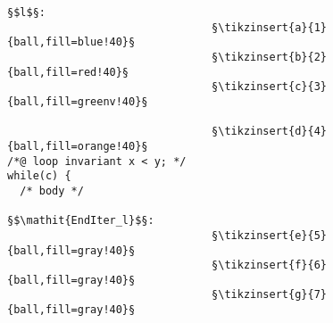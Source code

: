 \begin{figure}[bt]
  \begin{minipage}{0.65\textwidth}
  \end{minipage}\hfill
  \begin{minipage}{0.49\textwidth}
    \begin{lstlisting}[escapechar=§]
§$l$§:
                                §\tikzinsert{a}{1}{ball,fill=blue!40}§
                                §\tikzinsert{b}{2}{ball,fill=red!40}§
                                §\tikzinsert{c}{3}{ball,fill=greenv!40}§

                                §\tikzinsert{d}{4}{ball,fill=orange!40}§
/*@ loop invariant x < y; */
while(c) {
  /* body */

§$\mathit{EndIter_l}$§:
                                §\tikzinsert{e}{5}{ball,fill=gray!40}§
                                §\tikzinsert{f}{6}{ball,fill=gray!40}§
                                §\tikzinsert{g}{7}{ball,fill=gray!40}§


\end{lstlisting}
\end{minipage}
\end{figure}
